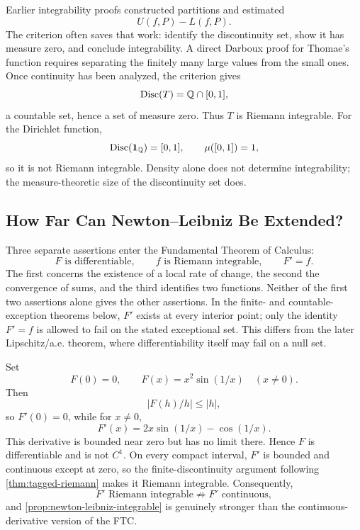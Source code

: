 \begin{remark}
Earlier integrability proofs constructed partitions and estimated
\[
U(f,P)-L(f,P).
\]
The criterion often saves that work: identify the discontinuity set, show
it has measure zero, and conclude integrability. A direct Darboux proof for
Thomae's function requires separating the finitely many large values from
the small ones. Once continuity has been analyzed, the criterion gives
\[
\operatorname{Disc}(T)=\mathbb{Q}\cap[0,1],
\]
a countable set, hence a set of measure zero. Thus $T$ is Riemann integrable.
For the Dirichlet function,
\[
\operatorname{Disc}(\mathbf1_{\mathbb{Q}})=[0,1],\qquad \mu([0,1])=1,
\]
so it is not Riemann integrable. Density alone does not determine
integrability; the measure-theoretic size of the discontinuity set does.
\end{remark}




\subsection{How Far Can Newton--Leibniz Be Extended?}
\label{sec:extended-newton-leibniz}

Three separate assertions enter the Fundamental Theorem of Calculus:
\[
\boxed{F\text{ is differentiable},\qquad
f\text{ is Riemann integrable},\qquad F'=f.}
\]
The first concerns the existence of a local rate of change, the second
the convergence of sums, and the third identifies two functions. Neither
of the first two assertions alone gives the other assertions.
In the finite- and countable-exception theorems below, $F'$ exists at every
interior point; only the identity $F'=f$ is allowed to fail on the stated
exceptional set. This differs from the later Lipschitz/a.e. theorem, where
differentiability itself may fail on a null set.

\begin{example}
\label{ex:bounded-discontinuous-derivative}
Set
\[
F(0)=0,
\qquad
F(x)=x^2\sin(1/x)\quad(x\ne0).
\]
Then
\[
|F(h)/h|\leq|h|,
\]
 so \(F'(0)=0\), while for \(x\ne0\),
\[
F'(x)=2x\sin(1/x)-\cos(1/x).
\]
This derivative is bounded near zero but has no limit there. Hence \(F\) is
differentiable and is not \(C^1\). On every compact interval, \(F'\) is
bounded and continuous except at zero, so the finite-discontinuity argument
following \cref{thm:tagged-riemann} makes it Riemann integrable.
Consequently,
\[
F'\text{ Riemann integrable}
\not\Longrightarrow
F'\text{ continuous},
\]
and \cref{prop:newton-leibniz-integrable} is genuinely stronger than the
continuous-derivative version of the FTC.
\end{example}

